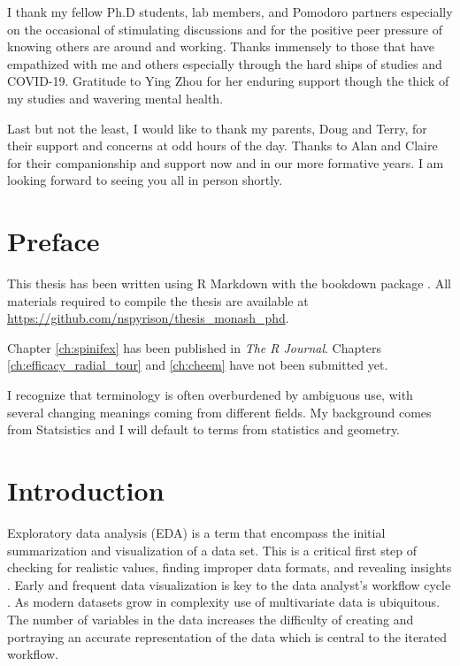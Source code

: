 \documentclass{template/monashthesis}
\begin{document}
I thank my fellow Ph.D students, lab members, and Pomodoro partners especially on the occasional of stimulating discussions and for the positive peer pressure of knowing others are around and working. Thanks immensely to those that have empathized with me and others especially through the hard ships of studies and COVID-19. Gratitude to Ying Zhou for her enduring support though the thick of my studies and wavering mental health.

Last but not the least, I would like to thank my parents, Doug and Terry, for their support and concerns at odd hours of the day. Thanks to Alan and Claire for their companionship and support now and in our more formative years. I am looking forward to seeing you all in person shortly.

\hypertarget{preface}{%
\chapter*{Preface}\label{preface}}

This thesis has been written using R Markdown with the bookdown package \autocite{xie_bookdown:_2016}. All materials required to compile the thesis are available at \url{https://github.com/nspyrison/thesis_monash_phd}.

Chapter \ref{ch:spinifex} has been published in \emph{The R Journal}. Chapters \ref{ch:efficacy_radial_tour} and \ref{ch:cheem} have not been submitted yet.

I recognize that terminology is often overburdened by ambiguous use, with several changing meanings coming from different fields. My background comes from Statsistics and I will default to terms from statistics and geometry.

\hypertarget{ch:introduction}{%
\chapter{Introduction}\label{ch:introduction}}

Exploratory data analysis (EDA) is a term that encompass the initial summarization and visualization of a data set. This is a critical first step of checking for realistic values, finding improper data formats, and revealing insights \autocite{tukey_exploratory_1977}. Early and frequent data visualization is key to the data analyst's workflow cycle \autocite{wickham_r_2017}. As modern datasets grow in complexity use of multivariate data is ubiquitous. The number of variables in the data increases the difficulty of creating and portraying an accurate representation of the data which is central to the iterated workflow.
\end{document}

